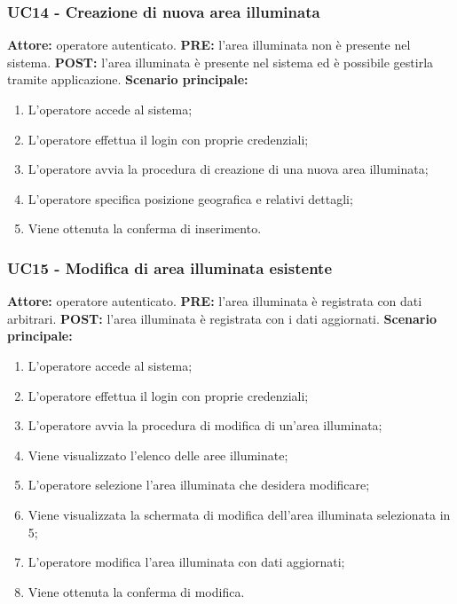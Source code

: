 \documentclass[a4paper, 12pt]{article}
\begin{document}
\subsubsection{UC14 - Creazione di nuova area illuminata}
\textbf{Attore:} operatore autenticato.\newline
\textbf{PRE:} l'area illuminata non è presente nel sistema.\newline
\textbf{POST:} l'area illuminata è presente nel sistema ed è possibile gestirla tramite applicazione.\newline
\textbf{Scenario principale:}
\begin{enumerate}
    \item L'operatore accede al sistema;
    \item L'operatore effettua il login con proprie credenziali;
    \item L'operatore avvia la procedura di creazione di una nuova area illuminata;
    \item L'operatore specifica posizione geografica e relativi dettagli;
    \item Viene ottenuta la conferma di inserimento.
\end{enumerate}

\subsubsection{UC15 - Modifica di area illuminata esistente}
\textbf{Attore:} operatore autenticato.\newline
\textbf{PRE:} l'area illuminata è registrata con dati arbitrari.\newline
\textbf{POST:} l'area illuminata è registrata con i dati aggiornati.\newline
\textbf{Scenario principale:}
\begin{enumerate}
    \item L'operatore accede al sistema;
    \item L'operatore effettua il login con proprie credenziali;
    \item L'operatore avvia la procedura di modifica di un'area illuminata;
    \item Viene visualizzato l'elenco delle aree illuminate;
    \item L'operatore selezione l'area illuminata che desidera modificare;
    \item Viene visualizzata la schermata di modifica dell'area illuminata selezionata in 5;
    \item L'operatore modifica l'area illuminata con dati aggiornati;
    \item Viene ottenuta la conferma di modifica.
\end{enumerate}
\end{document}
